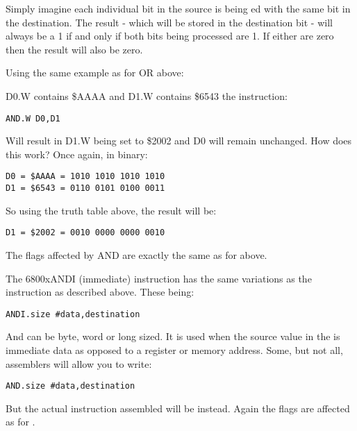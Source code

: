 Simply imagine each individual bit in the source is being ed with
    the same bit in the destination. The result -{} which will be stored in the
    destination bit -{} will always be a 1 if and only if both bits being
    processed are 1. If either are zero then the result will also be
    zero.

Using the same example as for OR above:

D0.W contains \$AAAA and D1.W contains \$6543 the instruction:

\begin{lstlisting}[firstnumber=1,]
          AND.W D0,D1
\end{lstlisting}

Will result in D1.W being set to \$2002 and D0 will remain unchanged.
    How does this work? Once again, in binary:

\begin{lstlisting}[firstnumber=1,frame=none,numbers=none]
D0 = $AAAA = 1010 1010 1010 1010
D1 = $6543 = 0110 0101 0100 0011
\end{lstlisting}

So using the truth table above, the result will be:

\begin{lstlisting}[firstnumber=1,frame=none,numbers=none]
D1 = $2002 = 0010 0000 0000 0010
\end{lstlisting}

The flags affected by AND are exactly the same as for 
    above.

The \mc6800x{ANDI} (immediate) instruction has the same variations as the  instruction as described above. These being:

\begin{lstlisting}[firstnumber=1,]
          ANDI.size #data,destination
\end{lstlisting}

And can be byte, word or long sized. It is used when the source
    value in the  is immediate data as opposed to a register or memory
    address. Some, but not all, assemblers will allow you to write:

\begin{lstlisting}[firstnumber=1,]
          AND.size #data,destination
\end{lstlisting}

But the actual instruction assembled will be  instead. Again the
    flags are affected as for .

